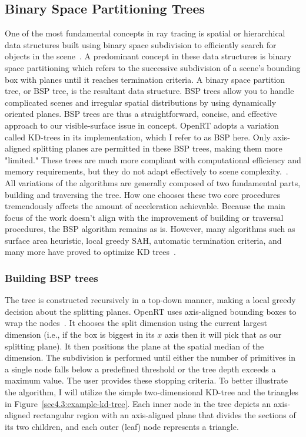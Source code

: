 \documentclass[a4paper,11pt,oneside]{article}
\begin{document}
\subsection{Binary Space Partitioning Trees}
\label{section:bsp-optimization}

One of the most fundamental concepts in ray tracing is spatial or hierarchical data structures built using binary space subdivision to efficiently search for objects in the scene~\cite{ray_tracing_BSP2}. A predominant concept in these data structures is binary space partitioning which refers to the successive subdivision of a scene's bounding box with planes until it reaches termination criteria. A binary space partition tree, or BSP tree, is the resultant data structure. BSP trees allow you to handle complicated scenes and irregular spatial distributions by using dynamically oriented planes. BSP trees are thus a straightforward, concise, and effective approach to our visible-surface issue in concept. OpenRT adopts a variation called KD-trees in its implementation, which I refer to as BSP here. Only axis-aligned splitting planes are permitted in these BSP trees, making them more "limited." These trees are much more compliant with computational efficiency and memory requirements, but they do not adapt effectively to scene complexity.~\cite{ray_tracing_BSP}. All variations of the algorithms are generally composed of two fundamental parts, building and traversing the tree. How one chooses these two core procedures tremendously affects the amount of acceleration achievable. Because the main focus of the work doesn't align with the improvement of building or traversal procedures, the BSP algorithm remains as is. However, many algorithms such as surface area heuristic, local greedy SAH, automatic termination criteria, and many more have proved to optimize KD trees~\cite{fast_building_kd_trees, parallel_kd_tree_construction}.

\subsubsection{Building BSP trees}

The tree is constructed recursively in a top-down manner, making a local greedy decision about the splitting planes. OpenRT uses axis-aligned bounding boxes to wrap the nodes~\cite{kd-tree-review}. It chooses the split dimension using the current largest dimension (i.e., if the box is biggest in its $x$ axis then it will pick that as our splitting plane). It then positions the plane at the spatial median of the dimension. The subdivision is performed until either the number of primitives in a single node falls below a predefined threshold or the tree depth exceeds a maximum value.  The user provides these stopping criteria. To better illustrate the algorithm, I will utilize the simple two-dimensional KD-tree and the triangles in Figure~\ref{sec4.3:example-kd-tree}. Each inner node in the tree depicts an axis-aligned rectangular region with an axis-aligned plane that divides the sections of its two children, and each outer (leaf) node represents a triangle.
\end{document}
